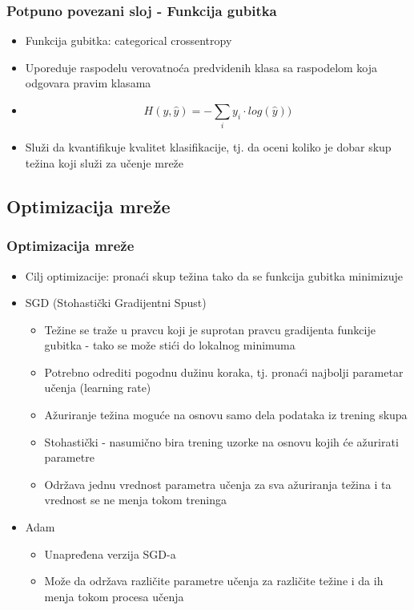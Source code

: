 \documentclass{beamer}
\begin{document}
\begin{frame}
\frametitle{Potpuno povezani sloj - Funkcija gubitka}

\begin{itemize}
\item Funkcija gubitka: categorical crossentropy
\item Uporeduje raspodelu verovatnoća predvidenih klasa sa raspodelom koja odgovara pravim klasama
\item $$ H(y, \hat{y}) = -\sum_{i} y_i\cdot log(\hat{y})) $$
\item Služi da kvantifikuje kvalitet klasifikacije, tj. da oceni koliko je dobar skup težina koji služi za učenje mreže
\end{itemize}

\end{frame}


\subsection{Optimizacija mreže}
\begin{frame}
\frametitle{Optimizacija mreže}

\begin{itemize}
\item Cilj optimizacije: pronaći skup težina tako da se funkcija gubitka minimizuje
\item SGD (Stohastički Gradijentni Spust)
\begin{itemize}
	\item Težine se traže u pravcu koji je suprotan pravcu gradijenta funkcije gubitka - tako se može stići do lokalnog minimuma 
	\item Potrebno odrediti pogodnu dužinu koraka, tj. pronaći najbolji parametar učenja (learning rate)
	\item Ažuriranje težina moguće na osnovu samo dela podataka iz trening skupa
	\item Stohastički - nasumično bira trening uzorke na osnovu kojih će ažurirati parametre
	\item Održava jednu vrednost parametra učenja za sva ažuriranja težina i ta vrednost se
ne menja tokom treninga
\end{itemize}
\item Adam
\begin{itemize}
	\item Unapređena verzija SGD-a
	\item Može da održava različite parametre učenja za različite težine i da ih menja tokom procesa učenja
\end{itemize}
\end{itemize}

\end{frame}
\end{document}
